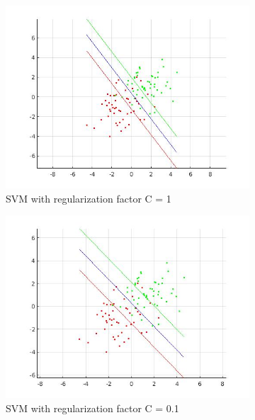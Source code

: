 \documentclass{article} %
\begin{document}
\begin{figure}
\begin{subfigure}{0.33\textwidth}
\centering
\includegraphics[scale=0.25]{images/c_1}
\caption{SVM with regularization factor C = 1}
\end{subfigure}
\begin{subfigure}{0.33\textwidth}
\centering
\includegraphics[scale=0.25]{images/c_p1}
\caption{SVM with regularization factor C = 0.1}
\end{subfigure}
\begin{subfigure}{0.33\textwidth}
\centering

\end{subfigure}
\end{figure}
\end{document}

